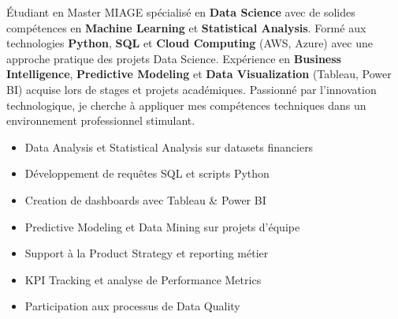 \documentclass[10pt,a4paper,normalphoto]{altacv}
\begin{document}




\begin{fullwidth}
\makecvheader
\vspace{-0.8em}
\end{fullwidth}

\begin{fullwidth}
\sffamily Étudiant en Master MIAGE spécialisé en \textbf{\color{DataGreen}Data Science} avec de solides compétences en \textbf{\color{DataGreen}Machine Learning} et \textbf{\color{DataGreen}Statistical Analysis}. Formé aux technologies \textbf{\color{DataGreen}Python}, \textbf{\color{DataGreen}SQL} et \textbf{\color{DataGreen}Cloud Computing} (AWS, Azure) avec une approche pratique des projets Data Science. Expérience en \textbf{\color{DataGreen}Business Intelligence}, \textbf{\color{DataGreen}Predictive Modeling} et \textbf{\color{DataGreen}Data Visualization} (Tableau, Power BI) acquise lors de stages et projets académiques. Passionné par l'innovation technologique, je cherche à appliquer mes compétences techniques dans un environnement professionnel stimulant.
\end{fullwidth}


\begin{itemize}
\item Data Analysis et Statistical Analysis sur datasets financiers
\item Développement de requêtes SQL et scripts Python
\item Creation de dashboards avec Tableau \& Power BI
\item Predictive Modeling et Data Mining sur projets d'équipe
\item Support à la Product Strategy et reporting métier
\item KPI Tracking et analyse de Performance Metrics
\item Participation aux processus de Data Quality
\end{itemize}
\end{document}
